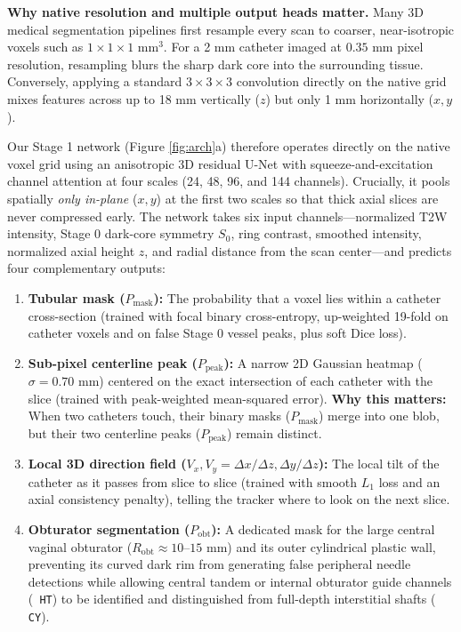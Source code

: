 \documentclass[
  11pt,
]{article}
\providecommand{\tightlist}{%
  \setlength{\itemsep}{0pt}\setlength{\parskip}{0pt}}
\let\nforigtexttt\texttt
\renewcommand{\texttt}[1]{\nforigtexttt{\XeTeXinterchartokenstate=1 #1}}
\begin{document}
\textbf{Why native resolution and multiple output heads matter.} Many 3D
medical segmentation pipelines first resample every scan to coarser,
near-isotropic voxels such as \(1 \times 1 \times 1\text{ mm}^3\). For a
2 mm catheter imaged at \(0.35\text{ mm}\) pixel resolution, resampling
blurs the sharp dark core into the surrounding tissue. Conversely,
applying a standard \(3 \times 3 \times 3\) convolution directly on the
native grid mixes features across up to 18 mm vertically (\(z\)) but
only 1 mm horizontally (\(x, y\)).

Our Stage 1 network (Figure \ref{fig:arch}a) therefore operates directly
on the native voxel grid using an anisotropic 3D residual U-Net with
squeeze-and-excitation channel attention at four scales (24, 48, 96, and
144 channels). Crucially, it pools spatially \emph{only in-plane}
(\(x, y\)) at the first two scales so that thick axial slices are never
compressed early. The network takes six input channels---normalized T2W
intensity, Stage 0 dark-core symmetry \(S_0\), ring contrast, smoothed
intensity, normalized axial height \(z\), and radial distance from the
scan center---and predicts four complementary outputs:

\begin{enumerate}
\def\labelenumi{\arabic{enumi}.}
\tightlist
\item
  \textbf{Tubular mask (\(P_{\text{mask}}\)):} The probability that a
  voxel lies within a catheter cross-section (trained with focal binary
  cross-entropy, up-weighted 19-fold on catheter voxels and on false
  Stage 0 vessel peaks, plus soft Dice loss).
\item
  \textbf{Sub-pixel centerline peak (\(P_{\text{peak}}\)):} A narrow 2D
  Gaussian heatmap (\(\sigma = 0.70\text{ mm}\)) centered on the exact
  intersection of each catheter with the slice (trained with
  peak-weighted mean-squared error). \textbf{Why this matters:} When two
  catheters touch, their binary masks (\(P_{\text{mask}}\)) merge into
  one blob, but their two centerline peaks (\(P_{\text{peak}}\)) remain
  distinct.
\item
  \textbf{Local 3D direction field
  (\(V_x, V_y = \Delta x/\Delta z, \Delta y/\Delta z\)):} The local tilt
  of the catheter as it passes from slice to slice (trained with smooth
  \(L_1\) loss and an axial consistency penalty), telling the tracker
  where to look on the next slice.
\item
  \textbf{Obturator segmentation (\(P_{\text{obt}}\)):} A dedicated mask
  for the large central vaginal obturator
  (\(R_{\text{obt}} \approx 10\text{--}15\text{ mm}\)) and its outer
  cylindrical plastic wall, preventing its curved dark rim from
  generating false peripheral needle detections while allowing central
  tandem or internal obturator guide channels (\texttt{HT}) to be
  identified and distinguished from full-depth interstitial shafts
  (\texttt{CY}).
\end{enumerate}
\end{document}
